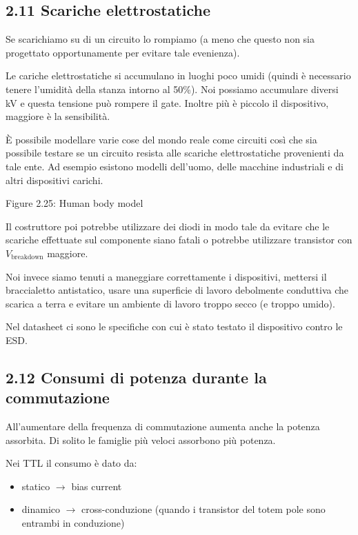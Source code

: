 \documentclass[
]{article}
\providecommand{\tightlist}{%
  \setlength{\itemsep}{0pt}\setlength{\parskip}{0pt}}
\begin{document}
\subsection{2.11 Scariche
elettrostatiche}\label{scariche-elettrostatiche}

Se scarichiamo su di un circuito lo rompiamo (a meno che questo non sia
progettato opportunamente per evitare tale evenienza).

Le cariche elettrostatiche si accumulano in luoghi poco umidi (quindi è
necessario tenere l'umidità della stanza intorno al 50\%). Noi possiamo
accumulare diversi kV e questa tensione può rompere il gate. Inoltre più
è piccolo il dispositivo, maggiore è la sensibilità.

È possibile modellare varie cose del mondo reale come circuiti così che
sia possibile testare se un circuito resista alle scariche
elettrostatiche provenienti da tale ente. Ad esempio esistono modelli
dell'uomo, delle macchine industriali e di altri dispositivi carichi.

Figure 2.25: Human body model

Il costruttore poi potrebbe utilizzare dei diodi in modo tale da evitare
che le scariche effettuate sul componente siano fatali o potrebbe
utilizzare transistor con \(V_{\text{breakdown}}\) maggiore.

Noi invece siamo tenuti a maneggiare correttamente i dispositivi,
mettersi il braccialetto antistatico, usare una superficie di lavoro
debolmente conduttiva che scarica a terra e evitare un ambiente di
lavoro troppo secco (e troppo umido).

Nel datasheet ci sono le specifiche con cui è stato testato il
dispositivo contro le ESD.

\subsection{2.12 Consumi di potenza durante la
commutazione}\label{consumi-di-potenza-durante-la-commutazione}

All'aumentare della frequenza di commutazione aumenta anche la potenza
assorbita. Di solito le famiglie più veloci assorbono più potenza.

Nei TTL il consumo è dato da:

\begin{itemize}
\tightlist
\item
  statico \(\rightarrow\) bias current
\item
  dinamico \(\rightarrow\) cross-conduzione (quando i transistor del
  totem pole sono entrambi in conduzione)
\end{itemize}
\end{document}
